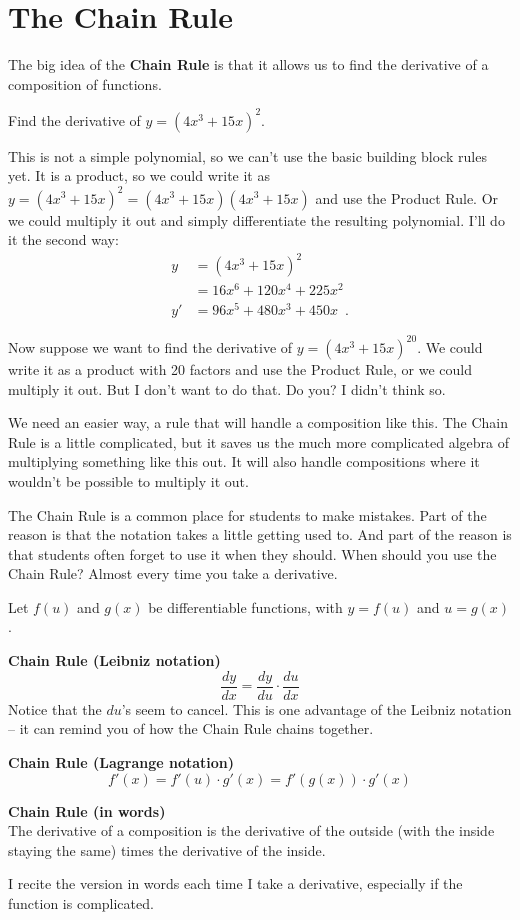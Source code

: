 \section{The Chain Rule}
\label{sec:chain}

The big idea of the {\bf Chain Rule} is that it allows us to find the derivative of a composition of functions.

\begin{example}
Find the derivative of $y=(4x^3+15x)^2$.

\begin{solution} This is not a simple polynomial, so we can't use the basic building block rules yet. It is a product, so we could write it as $y=(4x^3+15x)^2=(4x^3+15x)(4x^3+15x)$ and use the Product Rule. Or we could multiply it out and simply differentiate the resulting polynomial. I'll do it the second way:
\begin{align*}
		y &= \left(4x^3+15x\right)^2\\
		 &= 16x^6+120x^4+225x^2\\
		y' &= 96x^5+480x^3+450x \enspace .
	\end{align*}
\end{solution}\end{example}

Now suppose we want to find the derivative of $y=\left(4x^3+15x\right)^{20}$. We could write it as a product with 20 factors and use the Product Rule, or we could multiply it out. But I don't want to do that. Do you? I didn't think so.

We need an easier way, a rule that will handle a composition like this. The Chain Rule is a little complicated, but it saves us the much more complicated algebra of multiplying something like this out. It will also handle compositions where it wouldn't be possible to multiply it out.

The Chain Rule is a common place for students to make mistakes. Part of the reason is that the notation takes a little getting used to. And part of the reason is that students often forget to use it when they should. When should you use the Chain Rule? Almost every time you take a derivative.

\begin{theorem}
Let $f(u)$ and $g(x)$ be differentiable functions, with $y=f(u)$ and $u=g(x)$.

{\bf Chain Rule (Leibniz notation)}
$$\dfrac{dy}{dx}=\dfrac{dy}{du}\cdot\dfrac{du}{dx}$$
Notice that the $du$'s seem to cancel. This is one advantage of the Leibniz notation -- it can remind you of how the Chain Rule chains together.

{\bf Chain Rule (Lagrange notation)}
$$f'(x)=f'(u)\cdot g'(x)=f'\left(g(x)\right)\cdot g'(x)$$

{\bf Chain Rule (in words)} \\
The derivative of a composition is the derivative of the outside (with the inside staying the same) times the derivative of the inside.
\end{theorem}
I recite the version in words each time I take a derivative, especially if the function is complicated.

